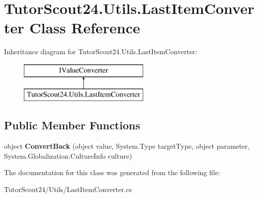 \hypertarget{class_tutor_scout24_1_1_utils_1_1_last_item_converter}{}\section{Tutor\+Scout24.\+Utils.\+Last\+Item\+Converter Class Reference}
\label{class_tutor_scout24_1_1_utils_1_1_last_item_converter}
Inheritance diagram for Tutor\+Scout24.\+Utils.\+Last\+Item\+Converter\+:\begin{figure}[H]
\begin{center}
\leavevmode
\includegraphics[height=2.000000cm]{class_tutor_scout24_1_1_utils_1_1_last_item_converter}
\end{center}
\end{figure}
\subsection*{Public Member Functions}
\begin{DoxyCompactItemize}
\item 
\mbox{\label{class_tutor_scout24_1_1_utils_1_1_last_item_converter_ab407ab46aa0c79d0cfa7cbb49315e6eb}} 
object {\bfseries Convert\+Back} (object value, System.\+Type target\+Type, object parameter, System.\+Globalization.\+Culture\+Info culture)
\end{DoxyCompactItemize}


The documentation for this class was generated from the following file\+:\begin{DoxyCompactItemize}
\item 
Tutor\+Scout24/\+Utils/Last\+Item\+Converter.\+cs\end{DoxyCompactItemize}

